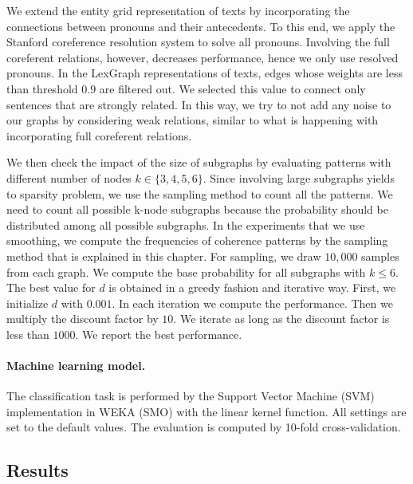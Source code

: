 We extend the entity grid representation of texts by incorporating the connections between pronouns and their antecedents. 
To this end, we apply the Stanford coreference resolution system \cite{leeheeyoung13} to solve all pronouns. 
Involving the full coreferent relations, however, decreases performance, hence we only use resolved pronouns. 
In the LexGraph representations of texts, edges whose weights are less than threshold $0.9$ are filtered out. 
We selected this value to connect only sentences that are strongly related. 
In this way, we try to not add any noise to our graphs by considering weak relations, similar to what is happening with incorporating full coreferent relations. 

We then check the impact of the size of subgraphs by evaluating patterns with different number of nodes $k \in \lbrace3,4,5,6\rbrace$. 
Since involving large subgraphs yields to sparsity problem, we use the sampling method to count all the patterns. 
We need to count all possible k-node subgraphs because the probability should be distributed among all possible subgraphs.  
In the experiments that we use smoothing, we compute the frequencies of coherence patterns by the sampling method that is explained in this chapter.  
For sampling, we draw $10,000$ samples from each graph. 
We compute the base probability for all subgraphs with $k \leq 6$.  
The best value for $d$ is obtained in a greedy fashion and iterative way.   
First, we initialize $d$ with $0.001$. 
In each iteration we compute the performance. 
Then we multiply the discount factor by $10$. 
We iterate as long as the discount factor is less than $1000$. 
We report the best performance.
 
\paragraph{Machine learning model.}
The classification task is performed by the Support Vector Machine (SVM) implementation in WEKA (SMO) with the linear kernel function.  
All settings are set to the default values. 
The evaluation is computed by \mbox{10-fold} \mbox{cross-validation}. 

\subsection{Results}

